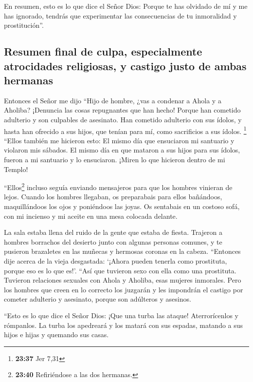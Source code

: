  En resumen, esto es lo que dice el Señor Dios: Porque te
has olvidado de mí y me has ignorado, tendrás que experimentar las
consecuencias de tu inmoralidad y prostitución''.

\hypertarget{resumen-final-de-culpa-especialmente-atrocidades-religiosas-y-castigo-justo-de-ambas-hermanas}{%
\subsection{Resumen final de culpa, especialmente atrocidades
religiosas, y castigo justo de ambas
hermanas}\label{resumen-final-de-culpa-especialmente-atrocidades-religiosas-y-castigo-justo-de-ambas-hermanas}}

 Entonces el Señor me dijo ``Hijo de hombre, ¿vas a
condenar a Ahola y a Aholiba? ¡Denuncia las cosas repugnantes que han
hecho!  Porque han cometido adulterio y son culpables de
asesinato. Han cometido adulterio con sus ídolos, y hasta han ofrecido a
sus hijos, que tenían para mí, como sacrificios a sus ídolos.
\footnote{\textbf{23:37} Jer 7,31}  ``Ellos también me
hicieron esto: El mismo día que ensuciaron mi santuario y violaron mis
sábados.  El mismo día en que mataron a sus hijos para
sus ídolos, fueron a mi santuario y lo ensuciaron. ¡Miren lo que
hicieron dentro de mi Templo!

 ``Ellos\footnote{\textbf{23:40} Refiriéndose a las dos
  hermanas.} incluso seguía enviando mensajeros para que los hombres
vinieran de lejos. Cuando los hombres llegaban, os preparabais para
ellos bañándoos, maquillándoos los ojos y poniéndoos las joyas.
 Os sentabais en un costoso sofá, con mi incienso y mi
aceite en una mesa colocada delante.

 La sala estaba llena del ruido de la gente que estaba de
fiesta. Trajeron a hombres borrachos del desierto junto con algunas
personas comunes, y te pusieron brazaletes en las muñecas y hermosas
coronas en la cabeza.  ``Entonces dije acerca de la vieja
desgastada: `¡Ahora pueden tenerla como prostituta, porque eso es lo que
es!'.  ``Así que tuvieron sexo con ella como una
prostituta. Tuvieron relaciones sexuales con Ahola y Aholiba, esas
mujeres inmorales.  Pero los hombres que creen en lo
correcto los juzgarán y les impondrán el castigo por cometer adulterio y
asesinato, porque son adúlteros y asesinos.

 ``Esto es lo que dice el Señor Dios: ¡Que una turba las
ataque! Aterrorícenlos y rómpanlos.  La turba los
apedreará y los matará con sus espadas, matando a sus hijos e hijas y
quemando sus casas.

